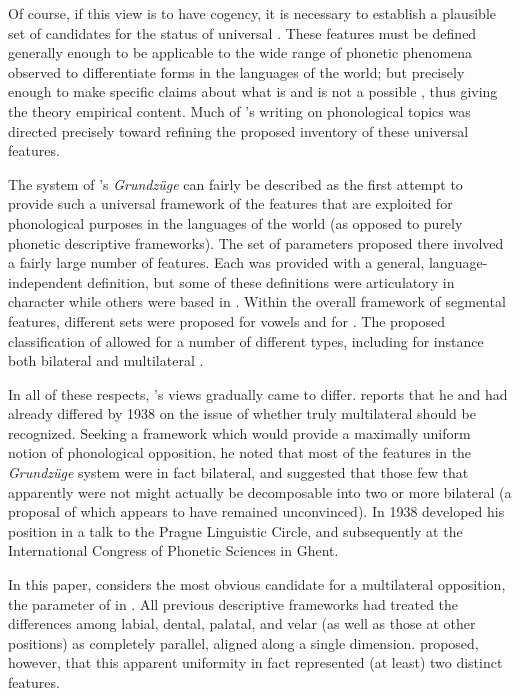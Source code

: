 Of course, if this view is to have cogency, it is necessary to
establish a plausible set of candidates for the status of universal
. These features must be defined generally enough
to be applicable to the wide range of phonetic phenomena observed to
differentiate forms in the languages of the world; but precisely
enough to make specific claims about what is and is not a possible
, thus giving the theory empirical content. Much of
{\Jakobson}'s writing on phonological topics was directed precisely
toward refining the proposed inventory of these universal features.

The system of {\Trubetzkoy}'s \textsl{Grundzüge} can fairly be described
as the first attempt to provide such a universal framework of the
features that are exploited for phonological purposes in the languages
of the world (as opposed to purely phonetic descriptive
frameworks). The set of parameters proposed there involved a fairly
large number of features. Each was provided with a general,
language-independent definition, but some of these definitions were
articulatory in character while others were based in . Within
the overall framework of segmental features, different sets were
proposed for vowels and for . The proposed classification of
 allowed for a number of different types, including for
instance both bilateral and multilateral .

In all of these respects, {\Jakobson}'s views gradually came to
differ. {\Jakobson} reports that he and {\Trubetzkoy} had already differed
by 1938 on the issue of whether truly multilateral  should
be recognized. Seeking a framework which would provide a maximally
uniform notion of phonological opposition, he noted that most of the
features in the \textsl{Grundzüge} system were in fact bilateral, and
suggested that those few that apparently were not might actually be
decomposable into two or more bilateral  (a proposal of
which {\Trubetzkoy} appears to have remained unconvinced). In 1938
{\Jakobson} developed his position in a talk to the Prague Linguistic
Circle, and subsequently at the International Congress of Phonetic
Sciences in Ghent.

In this paper, \citet{jakobson39:classement} considers the most
obvious candidate for a multilateral opposition, the parameter of
 in . All previous descriptive
frameworks had treated the differences among labial, dental, palatal,
and velar  (as well as those at other positions) as
completely parallel, aligned along a single dimension. {\Jakobson}
proposed, however, that this apparent uniformity in fact represented
(at least) two distinct features.

